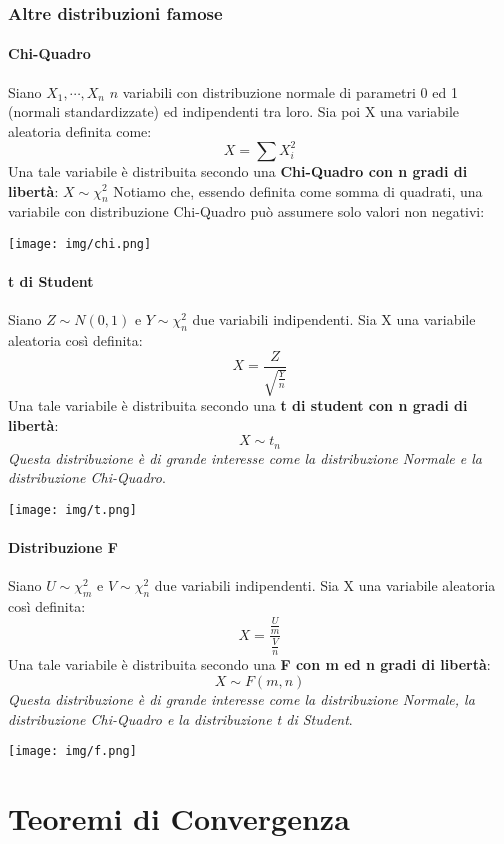 \documentclass[a4paper,12pt, oneside]{book}
\begin{document}
\subsection{Altre distribuzioni famose}
\subsubsection{Chi-Quadro}
Siano $X_1,\cdots, X_n$ $n$ variabili con distribuzione normale di parametri 0 ed 1 (normali
standardizzate) ed indipendenti tra loro. Sia poi X una variabile aleatoria definita come:
\[X=\sum X_i^2\]
Una tale variabile è distribuita secondo una\textbf{ Chi-Quadro con n gradi di libertà}:
$X\sim \chi_n^2$
Notiamo che, essendo definita come somma di quadrati, una variabile con distribuzione Chi-Quadro può assumere solo valori non negativi:
\begin{center}
	\texttt{[image: img/chi.png]}
\end{center}
\subsubsection{t di Student}
Siano $Z\sim N(0,1)$ e $Y\sim \chi_n^2$ due variabili indipendenti. Sia X una variabile aleatoria così definita:
\[X=\frac{Z}{\sqrt{\frac{Y}{n}}}\]
Una tale variabile è distribuita secondo una \textbf{t di student con n gradi di libertà}:
\[X\sim t_n\]
\textit{Questa distribuzione è di grande interesse come la distribuzione Normale e la distribuzione Chi-Quadro}.
\begin{center}
	\texttt{[image: img/t.png]}
\end{center}
\subsubsection{Distribuzione F}
Siano $U\sim\chi_m^2$ e $V\sim\chi_n^2$ due variabili indipendenti. Sia X una variabile aleatoria così definita:
\[X=\frac{\frac{U}{m}}{\frac{V}{n}}\]
Una tale variabile è
distribuita secondo una \textbf{F con m ed n gradi di libertà}:
\[X\sim F(m,n)\]
\textit{Questa distribuzione è di grande interesse come la distribuzione Normale, la
distribuzione Chi-Quadro e la distribuzione t di Student}.
\begin{center}
	\texttt{[image: img/f.png]}
\end{center}
\chapter{Teoremi di Convergenza}
\end{document}

